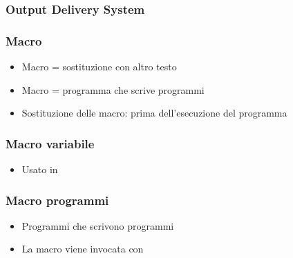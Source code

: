 \begin{frame}[containsverbatim]\frametitle{Output Delivery System}
\end{frame}

\begin{comment}
  \begin{frame}[containsverbatim]\frametitle{Grafici}
    \VerbatimInput{code/grafici1.sas}
  \end{frame}

  \begin{frame}[containsverbatim]\frametitle{Grafici 2}
    \VerbatimInput{code/grafici2.sas}
  \end{frame}

  \begin{frame}[containsverbatim]\frametitle{Grafici e Proc Corr}
    \VerbatimInput{code/grafici3.sas}
  \end{frame}


  \begin{frame}[containsverbatim]\frametitle{Grafici e Proc Reg}
    \VerbatimInput{code/grafici4.sas}
  \end{frame}
\end{comment}





\begin{frame}\frametitle{Macro}
  \begin{itemize}
  \item
    Macro = sostituzione con altro testo
  \item
    Macro = programma che scrive programmi
  \item
    Sostituzione delle macro: prima dell'esecuzione del programma
  \end{itemize}
\end{frame}

\begin{frame}[containsverbatim]\frametitle{Macro variabile}
  \begin{itemize}
  \item
    Usato in
  \end{itemize}
\end{frame}


\begin{frame}[containsverbatim]\frametitle{Macro programmi}
  \begin{itemize}
  \item
    Programmi che scrivono programmi
  \end{itemize}
  \begin{itemize}
  \item
    La macro viene invocata con
  \end{itemize}
\end{frame}


